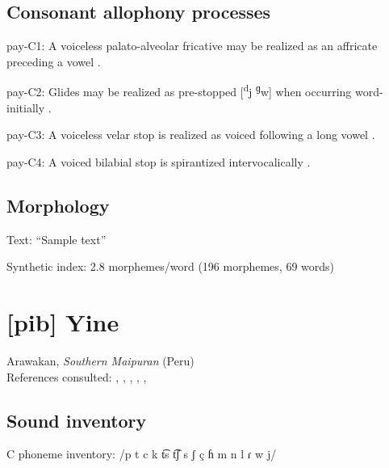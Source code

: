 {\subsection*{Consonant allophony processes}
\begin{appendixdesc}

\item[pay-C1:] A voiceless palato-alveolar fricative may be realized as an affricate preceding a vowel \citep[16]{Holt1999}.

\item[pay-C2:] Glides may be realized as pre-stopped [\textsuperscript{d}j \textsuperscript{ɡ}w] when occurring word-initially \citep[16]{Holt1999}.

\item[pay-C3:] A voiceless velar stop is realized as voiced following a long vowel \citep[15--16]{Holt1999}.

\item[pay-C4:] A voiced bilabial stop is spirantized intervocalically \citep[16]{Holt1999}.
\end{appendixdesc}
\subsection*{Morphology}

\begin{appendixdesc}

\item[Text:] “Sample text” \citep[79--80]{Holt1999}

\item[Synthetic index:] 2.8 morphemes/word (196 morphemes, 69 words)
\end{appendixdesc}
\section*{[pib] Yine}   %
Arawakan, \textit{Southern Maipuran} (Peru)\medskip\\
References consulted: \citet{Hanson2010}, \citet{Lin1993}, \citet{Lin1997}, \citet{Matteson1965}, \citet{Parker1989},  \citet{UrquíaSebastiánMarlett2008}

\subsection*{Sound inventory}
\begin{appendixdesc}

\item[C phoneme inventory:] /p t c k t͡s t͡ʃ s ʃ ç ɦ m n l ɾ w j/


\end{appendixdesc}}
